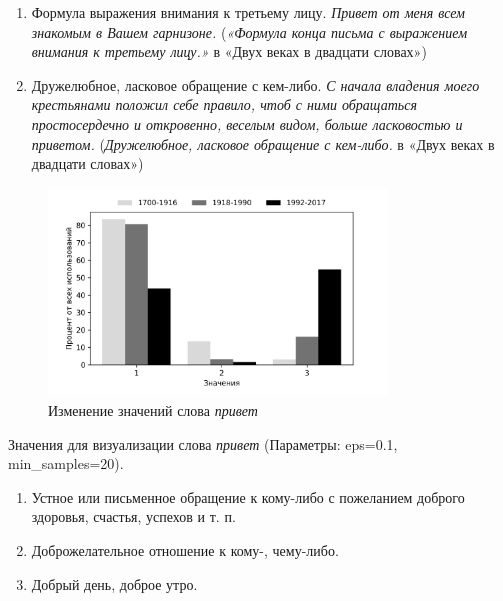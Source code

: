 \begin{enumerate}

    \item Формула выражения внимания к третьему лицу. \textit{Привет от меня всем знакомым в Вашем гарнизоне.}
(\textit{«Формула конца письма с выражением внимания к третьему лицу.»} в «Двух веках в двадцати словах»)

    \item Дружелюбное, ласковое обращение с кем-либо. \textit{С начала владения моего крестьянами положил себе правило, чтоб с ними обращаться простосердечно и откровенно, веселым видом, больше ласковостью и приветом.}
(\textit{Дружелюбное, ласковое обращение с кем-либо.} в «Двух веках в двадцати словах»)
\end{enumerate}

\begin{figure}[H]
	\centering
	\includegraphics[width=0.8\textwidth]{img/visualizations/privet_minimal}
	\caption{Изменение значений слова \textit{привет}}
	\label{fig:Привет}
\end{figure}

Значения для визуализации слова \textit{привет} (Параметры: eps=0.1, min\_samples=20).

\begin{enumerate}
    \item Устное или письменное обращение к кому-либо с пожеланием доброго здоровья, счастья, успехов и т. п.
    \item Доброжелательное отношение к кому-, чему-либо.
    \item Добрый день, доброе утро.
\end{enumerate}

